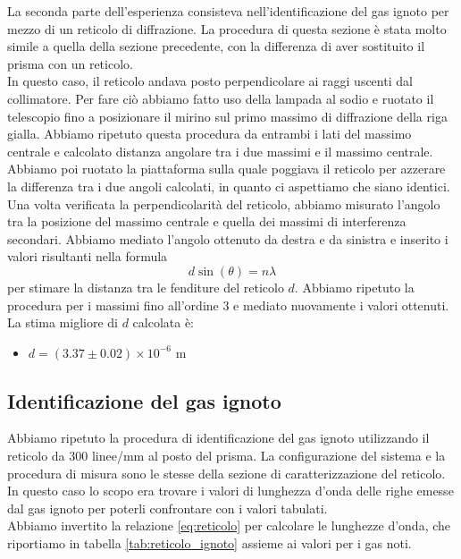 \documentclass[letterpaper,12pt]{article}
\begin{document}
La seconda parte dell'esperienza consisteva nell'identificazione del gas ignoto per mezzo di un reticolo di diffrazione.
La procedura di questa sezione è stata molto simile a quella della sezione precedente, con la differenza di aver sostituito
il prisma con un reticolo. \\
In questo caso, il reticolo andava posto perpendicolare ai raggi uscenti dal collimatore. Per fare ciò abbiamo fatto uso della lampada
al sodio e ruotato il telescopio fino a posizionare il mirino sul primo massimo di diffrazione della riga gialla.
Abbiamo ripetuto questa procedura da entrambi i lati del massimo centrale e calcolato distanza angolare tra i due massimi e il massimo centrale.
Abbiamo poi ruotato la piattaforma sulla quale poggiava il reticolo per azzerare la differenza tra i due angoli calcolati, in quanto ci aspettiamo che siano identici.\\

Una volta verificata la perpendicolarità del reticolo, abbiamo misurato l'angolo tra la posizione del massimo centrale e quella dei massimi di
interferenza secondari. Abbiamo mediato l'angolo ottenuto da destra e da sinistra e inserito i valori risultanti nella formula
\begin{equation}
    d \sin(\theta) = n \lambda
    \label{eq:reticolo}
\end{equation}
per stimare la distanza tra le fenditure del reticolo $d$. Abbiamo ripetuto la procedura per i massimi fino all'ordine 3 e mediato nuovamente
i valori ottenuti. \\
La stima migliore di $d$ calcolata è:
\begin{itemize}
    \item $d = (3.37 \pm 0.02)\times10^{-6}$ m
\end{itemize}

\subsection{Identificazione del gas ignoto}
Abbiamo ripetuto la procedura di identificazione del gas ignoto utilizzando il reticolo da 300 linee/mm al posto del 
prisma. La configurazione del sistema e la procedura di misura sono le stesse della sezione di caratterizzazione del 
reticolo. In questo caso lo scopo era trovare i valori di lunghezza d'onda delle righe emesse dal gas ignoto per poterli 
confrontare con i valori tabulati. \\
Abbiamo invertito la relazione \ref{eq:reticolo} per calcolare le lunghezze d'onda, che riportiamo in tabella \ref{tab:reticolo_ignoto} 
assieme ai valori per i gas noti.
\end{document}
